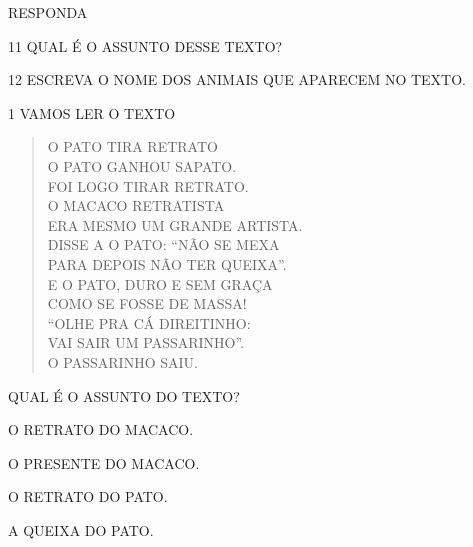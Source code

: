 
RESPONDA

\num{11} QUAL É O ASSUNTO DESSE TEXTO?


\num{12} ESCREVA O NOME DOS ANIMAIS QUE APARECEM NO TEXTO.




\num{1} VAMOS LER O TEXTO

\begin{verse}
O PATO TIRA RETRATO\\
O PATO GANHOU SAPATO.\\
FOI LOGO TIRAR RETRATO.\\
O MACACO RETRATISTA\\
ERA MESMO UM GRANDE ARTISTA.\\
DISSE A O PATO: “NÃO SE MEXA\\
PARA DEPOIS NÃO TER QUEIXA”.\\
E O PATO, DURO E SEM GRAÇA\\
COMO SE FOSSE DE MASSA!\\
“OLHE PRA CÁ DIREITINHO:\\
VAI SAIR UM PASSARINHO”.\\
O PASSARINHO SAIU.
\end{verse}


QUAL É O ASSUNTO DO TEXTO?

\begin{escolha}
\item O RETRATO DO MACACO.

\item O PRESENTE DO MACACO.

\item O RETRATO DO PATO.

\item A QUEIXA DO PATO.
\end{escolha}

